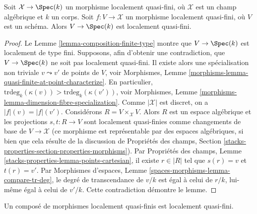 \begin{lemma}
\label{lemma-locally-quasi-finite-over-field}
Soit $\mathcal{X} \to \Spec(k)$ un morphisme localement quasi-fini, où
$\mathcal{X}$ est un champ algébrique et $k$ un corps. Soit
$f : V \to \mathcal{X}$ un morphisme localement quasi-fini, où $V$ est un
schéma. Alors $V \to \Spec(k)$ est localement quasi-fini.
\end{lemma}

\begin{proof}
Le Lemme \ref{lemma-composition-finite-type} montre que
$V \to \Spec(k)$ est localement de type fini.
Supposons, afin d'obtenir une contradiction, que $V \to \Spec(k)$ ne soit
pas localement quasi-fini. Il existe alors une spécialisation non triviale
$v \leadsto v'$ de points de $V$, voir Morphismes, Lemme
\ref{morphisms-lemma-quasi-finite-at-point-characterize}.
En particulier,
$\text{trdeg}_k(\kappa(v)) > \text{trdeg}_k(\kappa(v'))$, voir Morphismes,
Lemme \ref{morphisms-lemma-dimension-fibre-specialization}.
Comme $|\mathcal{X}|$ est discret, on a $|f|(v) = |f|(v')$.
Considérons $R = V \times_\mathcal{X} V$. Alors $R$ est un espace algébrique
et les projections $s, t : R \to V$ sont localement quasi-finies comme
changements de base de $V \to \mathcal{X}$ (ce morphisme est représentable
par des espaces algébriques, si bien que cela résulte de la discussion de
Propriétés des champs, Section
\ref{stacks-properties-section-properties-morphisms}).
Par Propriétés des champs,
Lemme \ref{stacks-properties-lemma-points-cartesian}, il existe
$r \in |R|$ tel que $s(r) = v$ et $t(r) = v'$.
Par Morphismes d'espaces,
Lemme \ref{spaces-morphisms-lemma-compare-tr-deg}, le degré de transcendance
de $v/k$ est égal à celui de $r/k$, lui-même égal à celui de $v'/k$.
Cette contradiction démontre le lemme.
\end{proof}

\begin{lemma}
\label{lemma-composition-locally-quasi-finite}
Un composé de morphismes localement quasi-finis est localement quasi-fini.
\end{lemma}

